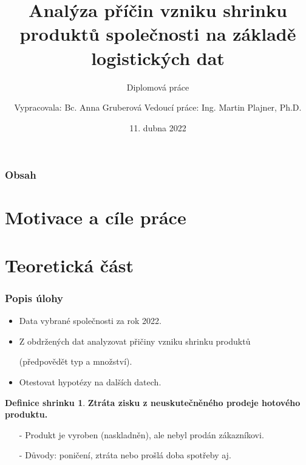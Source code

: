 \documentclass{beamer}
\author[Bc. Anna Gruberová]{Vypracovala: Bc. Anna Gruberová  \linebreak  Vedoucí práce: Ing. Martin Plajner, Ph.D.}
\institute[]{Fakulta jaderná a fyzikálně inženýrská ČVUT v Praze}
\date{11. dubna 2022}
\title{Analýza příčin vzniku shrinku produktů společnosti na základě logistických dat}
\subtitle{Diplomová práce}
\theoremstyle{definition}
\newtheorem{definice}{Definice shrinku}
\begin{document}
{
  \begin{frame}[plain]
	\vspace{0.8cm}
    \titlepage 
	\vspace{-0.8cm}
	
    \end{frame}
}
    
\begin{frame}
  \frametitle{Obsah}
  \tableofcontents
\end{frame}

\section{Motivace a cíle práce}
   



\section{Teoretická část}
   
\begin{frame}
    \frametitle{Popis úlohy}
	\begin{itemize}
		\item Data vybrané společnosti za rok 2022.
    	\item Z obdržených dat analyzovat přičiny vzniku shrinku produktů
    	\item[] (předpovědět typ a množství).
    	\item Otestovat hypotézy na dalších datech.
    \end{itemize}

	\begin{definice}
		\textbf{Ztráta zisku z neuskutečněného prodeje hotového produktu.}
		\begin{itemize}
			\item[ -]Produkt je vyroben (naskladněn), ale nebyl prodán zákazníkovi. 
			\item[ -]Důvody: poničení, ztráta nebo prošlá doba spotřeby aj. 
		\end{itemize}
	\end{definice}
	

\end{frame}
\end{document}
